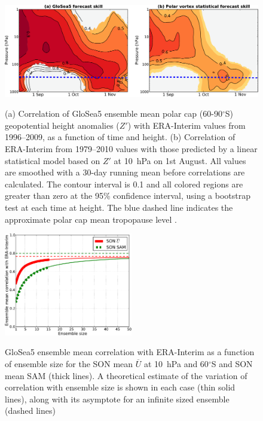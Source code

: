 \begin{figure}[t]
  \noindent\includegraphics[width=\textwidth,angle=0]{figures/GloSea5/lag_corr_crop.pdf}\\
  \caption[Lag-height correlation of GloSea5 polar cap geopotential height]{(a) Correlation of GloSea5 ensemble mean polar cap (60-90$^{\circ}$S) geopotential height anomalies ($Z'$) with ERA-Interim values from 1996--2009, as a function of time and height. (b) Correlation of ERA-Interim from 1979--2010 values with those predicted by a linear statistical model based on $Z'$ at 10~hPa on 1st August. All values are smoothed with a 30-day running mean before correlations are calculated. The contour interval is 0.1 and all colored regions are greater than zero at the 95\% confidence interval, using a bootstrap test at each time at height. The blue dashed line indicates the approximate polar cap mean tropopause level \citep{Wilcox2012}.}\label{Fig7}
\end{figure}

\begin{figure}[t]
  \noindent\includegraphics[width=0.5\textwidth,angle=0]{figures/GloSea5/corr_ens_size_crop.pdf}\\
  \caption[Variation of GloSea5 forecast skill with ensemble size]{GloSea5 ensemble mean correlation with ERA-Interim as a function of ensemble size for the SON mean $\overline{U}$ at 10~hPa and 60$^{\circ}$S and SON mean SAM (thick lines). A theoretical estimate of the variation of correlation with ensemble size is shown in each case (thin solid lines), along with its asymptote for an infinite sized ensemble (dashed lines)}\label{Fig8}
\end{figure}

